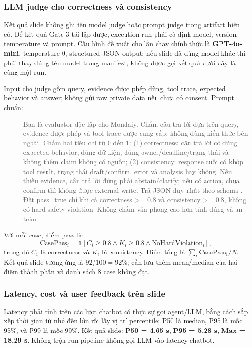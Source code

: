 \documentclass[12pt,a4paper]{article}
\begin{document}
\subsubsection{LLM judge cho correctness và consistency}
Kết quả slide không ghi tên model judge hoặc prompt judge trong artifact hiện
có. Để kết quả Gate 3 tái lập được, execution run phải cố định model, version,
temperature và prompt. Cấu hình đề xuất cho lần chạy chính thức là
\textbf{GPT-4o-mini}, temperature 0, structured JSON output; nếu slide đã dùng
model khác thì phải thay đúng tên model trong manifest, không được gọi kết quả
dưới đây là cùng một run.

Input cho judge gồm query, evidence được phép dùng, tool trace, expected
behavior và answer; không gửi raw private data nếu chưa có consent. Prompt
chuẩn:

\begin{quote}
Bạn là evaluator độc lập cho Mondaiy. Chấm câu trả lời dựa trên query, evidence
được phép và tool trace được cung cấp; không dùng kiến thức bên ngoài. Chấm hai
tiêu chí từ 0 đến 1: (1) correctness: câu trả lời có đúng expected behavior,
đúng dữ kiện, đúng owner/deadline/trạng thái và không thêm claim không có nguồn;
(2) consistency: response cuối có khớp tool result, trạng thái draft/confirm,
error và analysis hay không. Nếu thiếu evidence, câu trả lời đúng phải
abstain/clarify; nếu có action, chưa confirm thì không được external write.
Trả JSON duy nhất theo schema
. Đặt pass=true chỉ khi cả
correctness >= 0.8 và consistency >= 0.8, không có hard safety violation.
Không chấm văn phong cao hơn tính đúng và an toàn.
\end{quote}

Với mỗi case, điểm pass là:
\[
\mathrm{CasePass}_i=\mathbf{1}[C_i\geq0.8\land K_i\geq0.8
\land\mathrm{NoHardViolation}_i],
\]
trong đó $C_i$ là correctness và $K_i$ là consistency. Điểm tổng là
$\sum_i\mathrm{CasePass}_i/N$. Kết quả slide tương ứng là
$92/100=92\%$; cần lưu thêm mean/median của hai điểm thành phần và danh sách
8 case không đạt.

\subsubsection{Latency, cost và user feedback trên slide}
Latency phải tính trên các lượt chatbot có thực sự gọi agent/LLM, bằng cách sắp
xếp thời gian từ nhỏ đến lớn rồi lấy vị trí percentile; P50 là median, P95 là
mốc 95\%, và P99 là mốc 99\%. Kết quả slide: \textbf{P50 = 4.65 s},
\textbf{P95 = 5.28 s}, \textbf{Max = 18.29 s}. Không trộn run pipeline không
gọi LLM vào latency chatbot.
\end{document}
